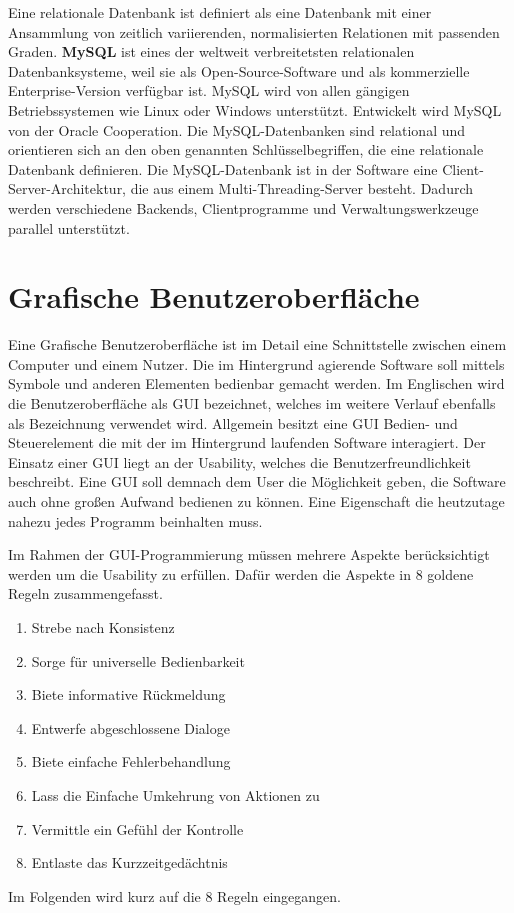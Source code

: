\documentclass[a4paper,titlepage,halfparskip,12pt]{scrreprt}
\begin{document}
\begin{onehalfspacing}
Eine relationale Datenbank ist definiert als eine Datenbank mit einer Ansammlung von zeitlich variierenden, normalisierten Relationen mit passenden Graden.
\textbf{MySQL} ist eines der weltweit verbreitetsten relationalen Datenbanksysteme, weil sie als Open-Source-Software und als kommerzielle Enterprise-Version verfügbar ist. MySQL wird von allen gängigen Betriebssystemen wie Linux oder Windows unterstützt. Entwickelt wird MySQL von der Oracle Cooperation. Die MySQL-Datenbanken sind relational und orientieren sich an den oben genannten Schlüsselbegriffen, die eine relationale Datenbank definieren. Die MySQL-Datenbank ist in der Software eine Client-Server-Architektur, die aus einem Multi-Threading-Server besteht. Dadurch werden verschiedene Backends, Clientprogramme und Verwaltungswerkzeuge parallel unterstützt.\cite{MysqlDoc}
\newpage

\section{Grafische Benutzeroberfläche}
\label{sec:Benutzeroberfläche}
Eine Grafische Benutzeroberfläche ist im Detail eine Schnittstelle zwischen einem Computer und einem Nutzer. Die im Hintergrund agierende Software soll mittels Symbole und anderen Elementen bedienbar gemacht werden. Im Englischen wird die Benutzeroberfläche als \ac{GUI} bezeichnet, welches im weitere Verlauf ebenfalls als Bezeichnung verwendet wird. Allgemein besitzt eine \ac{GUI} Bedien- und Steuerelement die mit der im Hintergrund laufenden Software interagiert. Der Einsatz einer \ac{GUI} liegt an der Usability, welches die Benutzerfreundlichkeit beschreibt. Eine \ac{GUI} soll demnach dem User die Möglichkeit geben, die Software auch ohne großen Aufwand bedienen zu können. Eine Eigenschaft die heutzutage nahezu jedes Programm beinhalten muss. \cite{thesmann2016interface}

Im Rahmen der GUI-Programmierung müssen mehrere Aspekte berücksichtigt werden um die Usability zu erfüllen. Dafür werden die Aspekte in 8 goldene Regeln zusammengefasst.
\begin{enumerate}
	\item Strebe nach Konsistenz
	\item Sorge für universelle Bedienbarkeit
	\item Biete informative Rückmeldung
	\item Entwerfe abgeschlossene Dialoge
	\item Biete einfache Fehlerbehandlung
	\item Lass die Einfache Umkehrung von Aktionen zu
	\item Vermittle ein Gefühl der Kontrolle
	\item Entlaste das Kurzzeitgedächtnis
\end{enumerate}
Im Folgenden wird kurz auf die 8 Regeln eingegangen.


\end{onehalfspacing}
\end{document}
